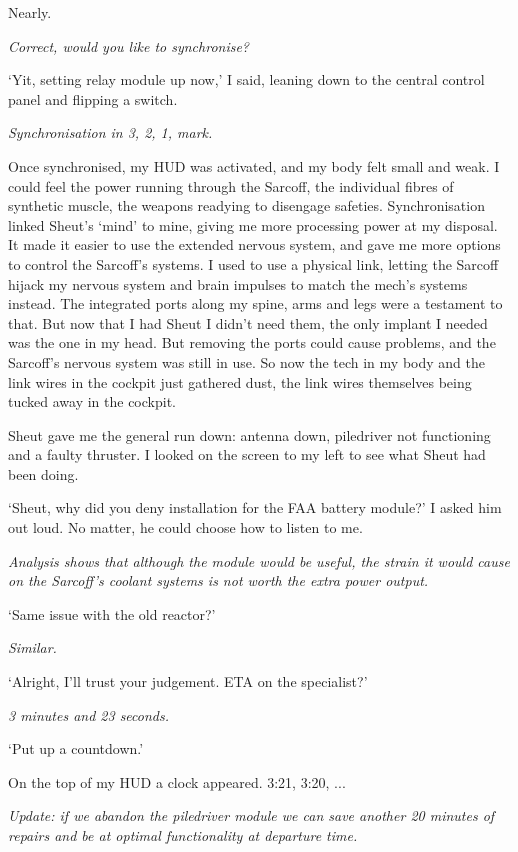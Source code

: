 Nearly.

{\it Correct, would you like to synchronise?}

`Yit, setting relay module up now,' I said, leaning down to the central control panel and flipping a switch.

{\it Synchronisation in 3, 2, 1, mark.}

Once synchronised, my HUD was activated, and my body felt small and weak. I could feel the power running through the Sarcoff, the individual fibres of synthetic muscle, the weapons readying to disengage safeties. Synchronisation linked Sheut's `mind' to mine, giving me more processing power at my disposal. It made it easier to use the extended nervous system, and gave me more options to control the Sarcoff's systems. I used to use a physical link, letting the Sarcoff hijack my nervous system and brain impulses to match the mech's systems instead. The integrated ports along my spine, arms and legs were a testament to that. But now that I had Sheut I didn't need them, the only implant I needed was the one in my head. But removing the ports could cause problems, and the Sarcoff's nervous system was still in use. So now the tech in my body and the link wires in the cockpit just gathered dust, the link wires themselves being tucked away in the cockpit.

Sheut gave me the general run down: antenna down, piledriver not functioning and a faulty thruster. I looked on the screen to my left to see what Sheut had been doing.

`Sheut, why did you deny installation for the FAA battery module?' I asked him out loud. No matter, he could choose how to listen to me.

{\it Analysis shows that although the module would be useful, the strain it would cause on the Sarcoff's coolant systems is not worth the extra power output.}

`Same issue with the old reactor?'

{\it Similar.}

`Alright, I'll trust your judgement. ETA on the specialist?'

{\it 3 minutes and 23 seconds.}

`Put up a countdown.'

On the top of my HUD a clock appeared. 3:21, 3:20, ...

{\it Update: if we abandon the piledriver module we can save another 20 minutes of repairs and be at optimal functionality at departure time.}


